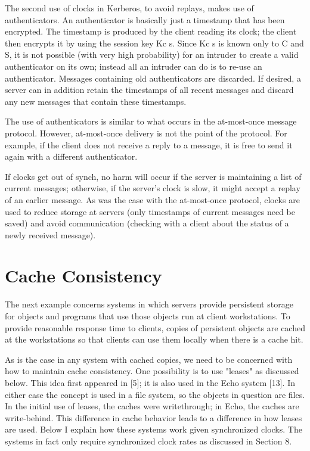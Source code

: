 \documentclass[a4paper,11pt,notitlepage,twoside,openright]{article}
\begin{document}
The second use of clocks in Kerberos, to avoid replays, makes use of
authenticators. An authenticator is basically just a timestamp that has
been encrypted. The timestamp is produced by the client reading its
clock; the client then encrypts it by using the session key Kc s. Since
Kc s is known only to C and S, it is not possible (with very high
probability) for an intruder to create a valid authenticator on its own;
instead all an intruder can do is to re-use an authenticator. Messages
containing old authenticators are discarded. If desired, a server can in
addition retain the timestamps of all recent messages and discard any
new messages that contain these timestamps.

The use of authenticators is similar to what occurs in the at-most-once
message protocol. However, at-most-once delivery is not the point of the
protocol. For example, if the client does not receive a reply to a
message, it is free to send it again with a different authenticator.


If clocks get out of synch, no harm will occur if the server is
maintaining a list of current messages; otherwise, if the server's clock
is slow, it might accept a replay of an earlier message. As was the case
with the at-most-once protocol, clocks are used to reduce storage at
servers (only timestamps of current messages need be saved) and avoid
communication (checking with a client about the status of a newly
received message).


\hypertarget{cache-consistency}{%
\section{Cache Consistency}\label{cache-consistency}}


The next example concerns systems in which servers provide persistent
storage for objects and programs that use those objects run at client
workstations. To provide reasonable response time to clients, copies of
persistent objects are cached at the workstations so that clients can
use them locally when there is a cache hit.

As is the case in any system with cached copies, we need to be concerned
with how to maintain cache consistency. One possibility is to use
"leases" as discussed below. This idea first appeared in {[}5{]}; it is
also used in the Echo system {[}13{]}. In either case the concept is
used in a file system, so the objects in question are files. In the
initial use of leases, the caches were writethrough; in Echo, the caches
are write-behind. This difference in cache behavior leads to a
difference in how leases are used. Below I explain how these systems
work given synchronized clocks. The systems in fact only require
synchronized clock rates as discussed in Section 8.
\end{document}
